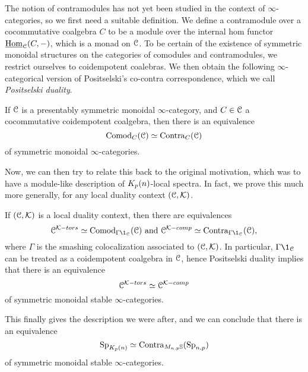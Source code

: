 The notion of contramodules has not yet been studied in the context of $\infty$-categories, so we first need a suitable definition. We define a contramodule over a cocommutative coalgebra $C$ to be a module over the internal hom functor $\operatorname{\underline{Hom}}_{\EuScript{C}}(C,-)$, which is a monad on $\EuScript{C}$. To be certain of the existence of symmetric monoidal structures on the categories of comodules and contramodules, we restrict ourselves to coidempotent coalebras. We then obtain the following $\infty$-categorical version of Positselski's co-contra correspondence, which we call \emph{Positselski duality}. 

\begin{theorem}
    If $\EuScript{C}$ is a presentably symmetric monoidal $\infty$-category, and $C\in \EuScript{C}$ a cocommutative coidempotent coalgebra, then there is an equivalence 
    \[\mathrm{Comod}_C(\EuScript{C})\simeq \mathrm{Contra}_C(\EuScript{C})\]
    of symmetric monoidal $\infty$-categories. 
\end{theorem}

Now, we can then try to relate this back to the original motivation, which was to have a module-like description of ${K_p(n)}$-local spectra. In fact, we prove this much more generally, for any local duality context $(\EuScript{C}, \mathcal{K})$. 

\begin{theorem}
    If $(\EuScript{C}, \mathcal{K})$ is a local duality context, then there are equivalences 
    \[\C^{\K-tors}\simeq \Comod_{\Gamma \1_\C}(\C) \text{ and } \C^{\K-comp}\simeq \Contra_{\Gamma \1_\C}(\C),\]
    where $\Gamma$ is the smashing colocalization associated to $(\EuScript{C}, \mathcal{K})$. In particular, $\Gamma \1_\C$ can be treated as a coidempotent coalgebra in $\EuScript{C}$, hence Positselski duality implies that there is an equivalence 
    \[\EuScript{C}^{\mathcal{K}-tors}\simeq \EuScript{C}^{\mathcal{K}-comp}\]
    of symmetric monoidal stable $\infty$-categories. 
\end{theorem}

This finally gives the description we were after, and we can conclude that there is an equivalence 
\[\mathrm{Sp}_{K_p(n)} \simeq \mathrm{Contra}_{M_{n,p} \mathbb{S}}(\mathrm{Sp}_{n,p})\]
of symmetric monoidal stable $\infty$-categories. 


